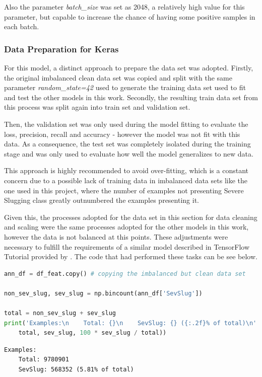 \documentclass{article}
\begin{document}
Also the parameter \emph{batch\_size} was set as 2048, a relatively high value for this parameter, but capable to increase the chance of having some positive samples in each batch.

\subsubsection{Data Preparation for Keras}

For this model, a distinct approach to prepare the data set was adopted. Firstly, the original imbalanced clean data set was copied and split with the same parameter \emph{random\_state=42} used to generate the training data set used to fit and test the other models in this work. Secondly, the resulting train data set from this process was split again into train set and validation set.

Then, the validation set was only used during the model fitting to evaluate the loss, precision, recall and accuracy - however the model was not fit with this data. As a consequence, the test set was completely isolated during the training stage and was only used to evaluate how well the model generalizes to new data. 

This approach is highly recommended to avoid over-fitting, which is a constant concern due to a possible lack of training data in imbalanced data sets \parencite{tensorflow2015-whitepaper} like the one used in this project, where the number of examples not presenting Severe Slugging class greatly outnumbered the examples presenting it.

Given this, the processes adopted for the data set in this section for data cleaning and scaling were the same processes adopted for the other models in this work, however the data is not balanced at this points. These adjustments were necessary to fulfill the requirements of a similar model described in TensorFlow Tutorial provided by \textcite{tensorflow2015-whitepaper}. The code that had performed these tasks can be see below. 

\begin{lstlisting}[language=Python]
ann_df = df_feat.copy() # copying the imbalanced but clean data set

non_sev_slug, sev_slug = np.bincount(ann_df['SevSlug'])

total = non_sev_slug + sev_slug
print('Examples:\n    Total: {}\n    SevSlug: {} ({:.2f}% of total)\n'.format(
    total, sev_slug, 100 * sev_slug / total))
\end{lstlisting}
\begin{verbatim}
Examples:
    Total: 9780901
    SevSlug: 568352 (5.81% of total)
\end{verbatim}
\end{document}
